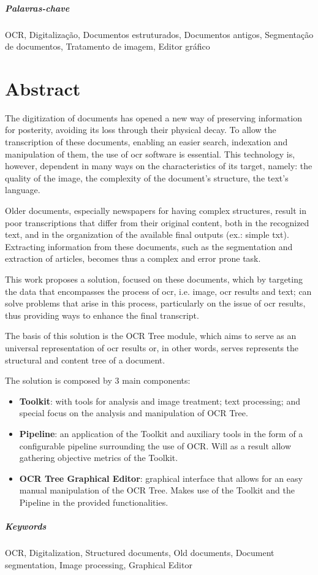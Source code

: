 \paragraph{Palavras-chave} OCR, Digitalização, Documentos estruturados, Documentos antigos, Segmentação de documentos, Tratamento de imagem, Editor gráfico

\cleardoublepage

\chapter*{Abstract}

The digitization of documents has opened a new way of preserving information for posterity, avoiding its loss through their physical decay. To allow the transcription of these documents, enabling an easier search, indexation and manipulation of them, the use of \acrshort{ocr} software is essential. This technology is, however, dependent in many ways on the characteristics of its target, namely: the quality of the image, the complexity of the document's structure, the text's language. 

Older documents, especially newspapers for having complex structures, result in poor transcriptions that differ from their original content, both in the recognized text, and in the organization of the available final outputs (ex.: simple txt).
Extracting information from these documents, such as the segmentation and extraction of articles, becomes thus a complex and error prone task. 

This work proposes  a solution, focused on these documents, which by targeting the data that encompasses  the process of \acrshort{ocr}, i.e. image, \acrshort{ocr} results and text; can solve problems that arise in this process, particularly on the issue of \acrshort{ocr} results, thus providing ways to enhance the final transcript.


The basis of this solution is the OCR Tree module, which aims to serve as an universal representation of \acrshort{ocr} results or, in other words, serves represents the structural and content tree of a document.

The solution is composed by 3 main components:
\begin{itemize}\setlength\itemsep{-0.5em}
	\vspace{-0.5em}
	\item \textbf{Toolkit}: with tools for analysis and image treatment; text processing; and special focus on the analysis and manipulation of OCR Tree.
	\item \textbf{Pipeline}: an application  of the Toolkit and auxiliary tools in the form of a configurable pipeline surrounding the use of OCR. Will as a result allow gathering objective  metrics of the Toolkit.
	\item \textbf{OCR Tree Graphical Editor}: graphical interface that allows for an easy manual manipulation of the OCR Tree. Makes use of the Toolkit and the Pipeline in the provided functionalities.
\end{itemize}


\paragraph{Keywords} OCR, Digitalization, Structured documents, Old documents, Document segmentation, Image processing, Graphical Editor

\cleardoublepage
